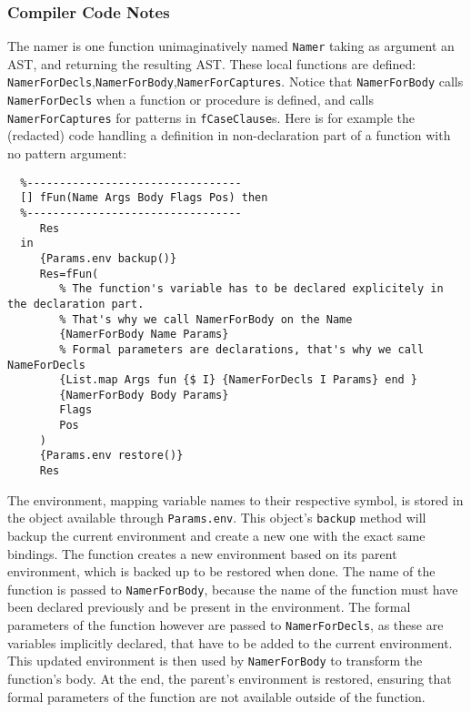 \documentclass[a4paper]{memoir}
\begin{document}


\subsubsection{Compiler Code Notes}
The namer is one function unimaginatively named \lstinline!Namer! taking as argument an AST, and returning the resulting AST.
These local functions are defined: \lstinline!NamerForDecls!,\lstinline!NamerForBody!,\lstinline!NamerForCaptures!.
Notice that \lstinline!NamerForBody! calls \lstinline!NamerForDecls! when a function or procedure is
defined, and calls \lstinline!NamerForCaptures! for patterns in \lstinline!fCaseClause!s. Here is for
example the (redacted) code handling a definition in non-declaration part of a
function with no pattern argument:

\begin{lstlisting}
  %---------------------------------
  [] fFun(Name Args Body Flags Pos) then
  %---------------------------------
     Res
  in
     {Params.env backup()} 
     Res=fFun(
        % The function's variable has to be declared explicitely in the declaration part.
        % That's why we call NamerForBody on the Name
        {NamerForBody Name Params}
        % Formal parameters are declarations, that's why we call NameForDecls
        {List.map Args fun {$ I} {NamerForDecls I Params} end }
        {NamerForBody Body Params}
        Flags
        Pos
     )
     {Params.env restore()}
     Res
\end{lstlisting}

The environment, mapping variable names to their respective symbol, is stored in
the object available through \lstinline!Params.env!. This object's
\lstinline!backup! method will backup the current environment and create a new
one with the exact same bindings.
The function creates a new environment based on its parent environment, which is
backed up to be restored when done. The name of the function is passed to \lstinline!NamerForBody!, because the name of the function must have been declared previously and be present in the environment. 
The formal parameters of the function however are passed to \lstinline!NamerForDecls!, as these are variables implicitly declared, that have to be added to the current environment. This updated environment is then used by \lstinline!NamerForBody! to transform the function's body.
At the end, the parent's environment is restored, ensuring that formal parameters of the function are not available outside of the function.
\end{document}
